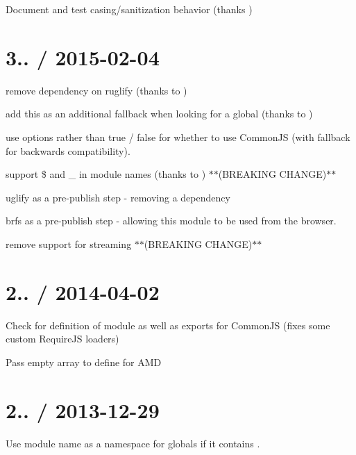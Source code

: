 
\begin{DoxyItemize}
\item Document and test casing/sanitization behavior (thanks )
\end{DoxyItemize}

\section*{3.. / 2015-\/02-\/04 }


\begin{DoxyItemize}
\item remove dependency on ruglify (thanks to )
\item add {\ttfamily this} as an additional fallback when looking for a global (thanks to )
\item use {\ttfamily options} rather than {\ttfamily true} / {\ttfamily false} for whether to use Common\+JS (with fallback for backwards compatibility).
\item support {\ttfamily \$} and {\ttfamily \+\_\+} in module names (thanks to ) $\ast$$\ast$(B\+R\+E\+A\+K\+I\+NG C\+H\+A\+N\+GE)$\ast$$\ast$
\item uglify as a pre-\/publish step -\/ removing a dependency
\item brfs as a pre-\/publish step -\/ allowing this module to be used from the browser.
\item remove support for streaming $\ast$$\ast$(B\+R\+E\+A\+K\+I\+NG C\+H\+A\+N\+GE)$\ast$$\ast$
\end{DoxyItemize}

\section*{2.. / 2014-\/04-\/02 }


\begin{DoxyItemize}
\item Check for definition of {\ttfamily module} as well as {\ttfamily exports} for Common\+JS (fixes some custom Require\+JS loaders)
\item Pass empty array to define for A\+MD
\end{DoxyItemize}

\section*{2.. / 2013-\/12-\/29 }


\begin{DoxyItemize}
\item Use module name as a namespace for globals if it contains {\ttfamily .}
\end{DoxyItemize}

